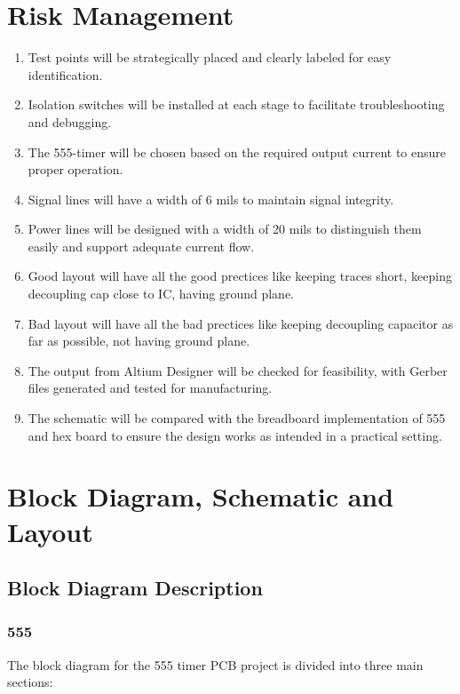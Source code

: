 \documentclass[a4paper,11pt]{article}%
\begin{document}
\section{Risk Management}
\begin{enumerate}
	\item Test points will be strategically placed and clearly labeled for easy identification.
	\item Isolation switches will be installed at each stage to facilitate troubleshooting and debugging.
	\item The 555-timer will be chosen based on the required output current to ensure proper operation.
	\item Signal lines will have a width of 6 mils to maintain signal integrity.
	\item Power lines will be designed with a width of 20 mils to distinguish them easily and support adequate current flow.
	\item Good layout will have all the good prectices like keeping traces short, keeping decoupling cap close to IC, having ground plane.
	\item Bad layout will have all the bad prectices like keeping decoupling capacitor as far as possible, not having ground plane.
	\item The output from Altium Designer will be checked for feasibility, with Gerber files generated and tested for manufacturing.
	\item The schematic will be compared with the breadboard implementation of 555 and hex board to ensure the design works as intended in a practical setting.
	
\end{enumerate}

\section{Block Diagram, Schematic and Layout}

\subsection{Block Diagram Description}
\subsubsection{555}
The block diagram for the 555 timer PCB project is divided into three main sections:
\end{document}

